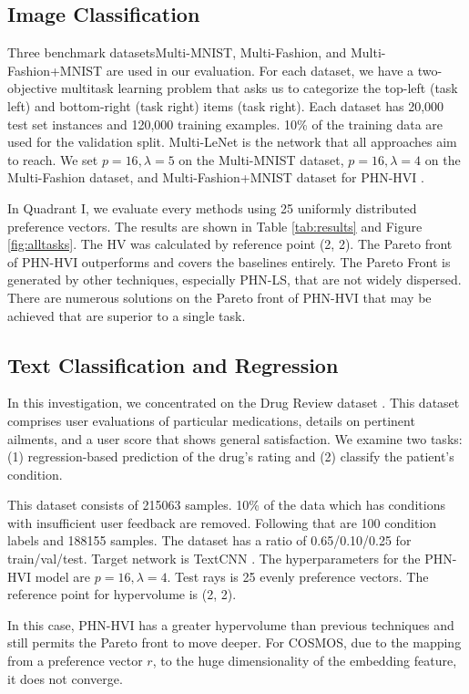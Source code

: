 \documentclass[letterpaper]{article} %
\newcommand{\ourmodel}{PHN-HVI }
\begin{document}
\subsection{Image Classification}
Three benchmark datasetsMulti-MNIST, Multi-Fashion, and Multi-Fashion+MNIST \cite{lin2019pareto} are used in our evaluation. For each dataset, we have a two-objective multitask learning problem that asks us to categorize the top-left (task left) and bottom-right (task right) items (task right). Each dataset has 20,000 test set instances and 120,000 training examples. 10\% of the training data are used for the validation split. Multi-LeNet \cite{sener2019multitask} is the network that all approaches aim to reach. We set $p=16, \lambda=5$ on the Multi-MNIST dataset, $p=16, \lambda=4$ on the Multi-Fashion dataset, and Multi-Fashion+MNIST dataset for \ourmodel.


In Quadrant I, we evaluate every methods using 25 uniformly distributed preference vectors. The results are shown in Table \ref{tab:results} and Figure \ref{fig:alltasks}. The HV was calculated by reference point (2, 2). The Pareto front of \ourmodel outperforms and covers the baselines entirely. The Pareto Front is generated by other techniques, especially PHN-LS, that are not widely dispersed. There are numerous solutions on the Pareto front of \ourmodel that may be achieved that are superior to a single task.

\subsection{Text Classification and Regression}


In this investigation, we concentrated on the Drug Review dataset \cite{Felix2018}. This dataset comprises user evaluations of particular medications, details on pertinent ailments, and a user score that shows general satisfaction. We examine two tasks: (1) regression-based prediction of the drug's rating and (2) classify the patient's condition.

This dataset consists of 215063 samples. 10\% of the data which has conditions with insufficient user feedback are removed.
Following that are 100 condition labels and 188155 samples. The dataset has a ratio of 0.65/0.10/0.25 for train/val/test. Target network is TextCNN \cite{TextCNN}. The hyperparameters for the \ourmodel model are $p=16, \lambda=4$. Test rays is 25 evenly preference vectors. The reference point for hypervolume is (2, 2).

In this case, \ourmodel has a greater hypervolume than previous techniques and still permits the Pareto front to move deeper. For COSMOS, due to the mapping from a preference vector $r$, to the huge dimensionality of the embedding feature, it does not converge.
\end{document}
